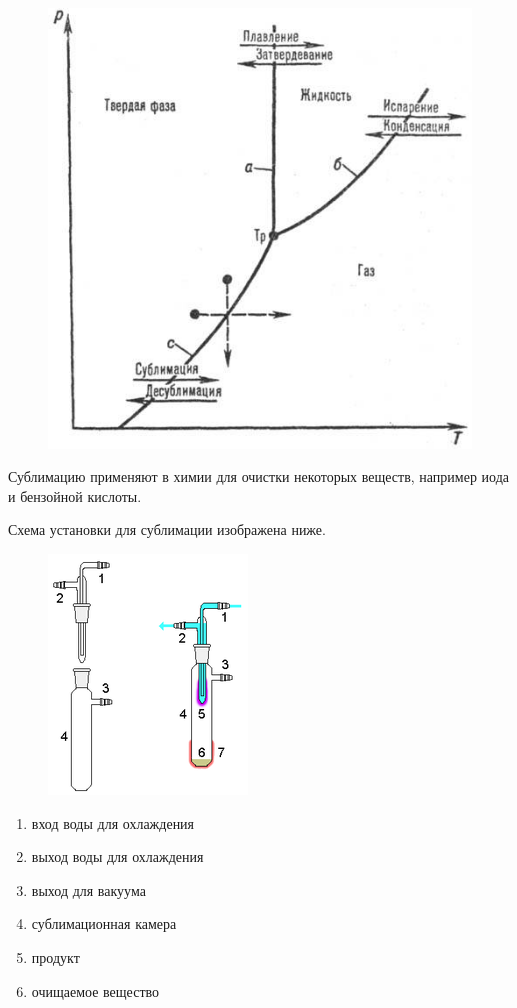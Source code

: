 \documentclass[14pt,a4paper]{scrartcl}
\begin{document}
\begin{figure}[H]
\centering
\includegraphics[scale=.50]{sublimation.jpg}
\caption{}
\label{}
\end{figure}

Сублимацию применяют в химии для очистки некоторых веществ, например иода и бензойной кислоты.

Схема установки для сублимации изображена ниже.
\begin{figure}[H]
\centering
\includegraphics[scale=1.3]{sublimation2.png}
\caption{}
\label{}
\end{figure}

\begin{enumerate}
\item вход воды для охлаждения
\item выход воды для охлаждения
\item выход для вакуума
\item сублимационная камера
\item продукт
\item очищаемое вещество
\end{enumerate}
\end{document}
